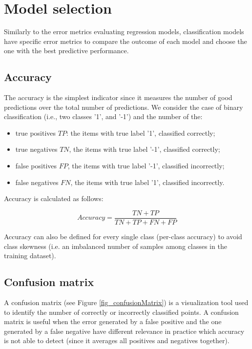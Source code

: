 \section{Model selection}
Similarly to the error metrics evaluating regression models, classification models have specific error metrics to compare the outcome of each model and choose the one with the best predictive performance.

\subsection{Accuracy}
The accuracy is the simplest indicator since it measures the number of good predictions over the total number of predictions. We consider the case of binary classification (i.e., two classes '1', and '-1') and the number of the:

\begin{itemize}
    \item true positives $TP$: the items with true label '1', classified correctly;
    \item true negatives $TN$, the items with true label '-1', classified correctly;
    \item false positives $FP$, the items with true label '-1', classified incorrectly;
    \item false negatives $FN$, the items with true label '1', classified incorrectly.
\end{itemize}
Accuracy is calculated as follows:

\begin{equation}
        Accuracy=\frac{TN+TP}{TN+TP+FN+FP}
        \label{eq_accuracy}
\end{equation}

Accuracy can also be defined for every single class (per-class accuracy) to avoid class skewness (i.e. an imbalanced number of samples among classes in the training dataset).

\subsection{Confusion matrix}
A confusion matrix (see Figure \ref{fig_confusionMatrix}) is a visualization tool used to identify the number of correctly or incorrectly classified points. A confusion matrix is useful when the error generated by a false positive and the one generated by a false negative have different relevance in practice which accuracy is not able to detect (since it averages all positives and negatives together).


